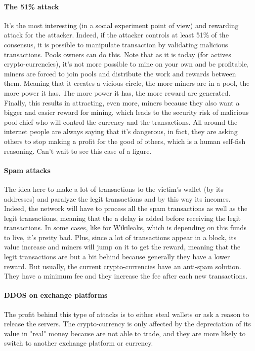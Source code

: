 \paragraph{The 51\% attack}
It's the most interesting (in a social experiment point of view) and rewarding attack for the attacker. Indeed, if the attacker controls at least 51\% of the consensus, it is possible to manipulate transaction by validating malicious transactions. Pools owners can do this. Note that as it is today (for actives crypto-currencies), it's not more possible to mine on your own and be profitable, miners are forced to join pools and distribute the work and rewards between them. Meaning that it creates a vicious circle, the more miners are in a pool, the more power it has. The more power it has, the more reward are generated. Finally, this results in attracting, even more, miners because they also want a bigger and easier reward for mining, which leads to the security risk of malicious pool chief who will control the currency and the transactions. All around the internet people are always saying that it's dangerous, in fact, they are asking others to stop making a profit for the good of others, which is a human self-fish reasoning. Can't wait to see this case of a figure.

\paragraph{Spam attacks}
The idea here to make a lot of transactions to the victim's wallet (by its addresses) and paralyze the legit transactions and by this way its incomes. Indeed, the network will have to process all the spam transactions as well as the legit transactions, meaning that the a delay is added before receiving the legit transactions. In some cases, like for Wikileaks\cite{TheBitcoinNews2015BitcoinAttacks}, which is depending on this funds to live, it's pretty bad. Plus, since a lot of transactions appear in a block, its value increase and miners will jump on it to get the reward, meaning that the legit transactions are but a bit behind because generally they have a lower reward. But usually, the current crypto-currencies have an anti-spam solution. They have a minimum fee and they increase the fee after each new transactions.

\paragraph{DDOS on exchange platforms}
The profit behind this type of attacks is to either steal wallets or ask a reason to release the servers. The crypto-currency is only affected by the depreciation of its value in "real" money because are not able to trade, and they are more likely to switch to another exchange platform or currency.

